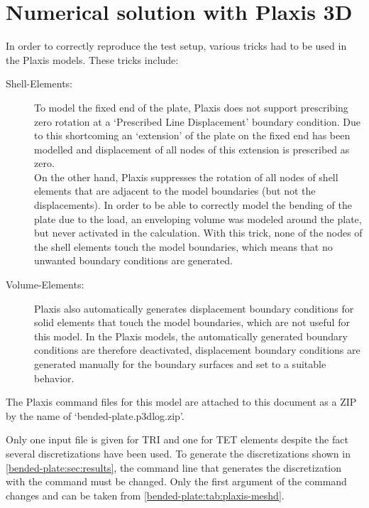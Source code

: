 
\section{Numerical solution with Plaxis 3D}
\label{bended-plate:sec:plaxis3D}

In order to correctly reproduce the test setup, various tricks had to be used
in the Plaxis models. These tricks include:

\begin{description}
    \item [Shell-Elements:]{To model the fixed end of the plate, Plaxis does not
          support prescribing zero rotation at a ‘Prescribed Line
          Displacement’ boundary condition. Due to this shortcoming
          an ‘extension’ of the plate on the fixed end has been
          modelled and displacement of all nodes of this extension is
          prescribed as zero.\\
          On the other hand, Plaxis suppresses the rotation of all nodes
          of shell elements that are adjacent to the model boundaries (but
          not the displacements). In order to be able to correctly model the
          bending of the plate due to the load, an enveloping volume was
          modeled around the plate, but never activated in the calculation.
          With this trick, none of the nodes of the shell elements touch the
          model boundaries, which means that no unwanted boundary conditions
          are generated.}
    \item [Volume-Elements:]{Plaxis also automatically generates displacement
          boundary conditions for solid elements that touch the model boundaries,
          which are not useful for this model. In the Plaxis models, the
          automatically generated boundary conditions are therefore deactivated,
          displacement boundary conditions are generated manually for the
          boundary surfaces and set to a suitable behavior.}
\end{description}

The Plaxis command files for this model are attached to this document as a ZIP
by the name of ‘bended-plate.p3dlog.zip’.


Only one input file is given for TRI and one for TET elements despite the fact
several discretizations have been used. To generate the discretizations shown
in \autoref{bended-plate:sec:results}, the command line that generates the
discretization with the  command must be changed. Only the
first argument of the  command changes and can be taken from
\autoref{bended-plate:tab:plaxis-meshd}.

